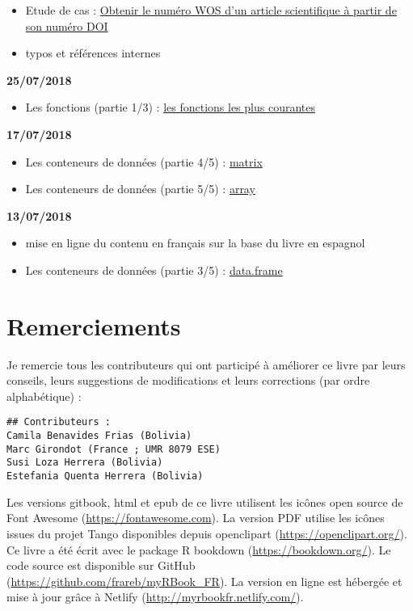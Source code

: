 \documentclass[]{book}
\providecommand{\tightlist}{%
  \setlength{\itemsep}{0pt}\setlength{\parskip}{0pt}}
\theoremstyle{definition}
\theoremstyle{definition}
\theoremstyle{definition}
\theoremstyle{remark}
\begin{document}
\begin{itemize}
\tightlist
\item
  Etude de cas : \protect\hyperlink{studyCase002}{Obtenir le numéro WOS
  d'un article scientifique à partir de son numéro DOI}
\item
  typos et références internes
\end{itemize}

\textbf{25/07/2018}

\begin{itemize}
\tightlist
\item
  Les fonctions (partie 1/3) : \protect\hyperlink{l015mainfun}{les
  fonctions les plus courantes}
\end{itemize}

\textbf{17/07/2018}

\begin{itemize}
\tightlist
\item
  Les conteneurs de données (partie 4/5) :
  \protect\hyperlink{l014matrix}{matrix}
\item
  Les conteneurs de données (partie 5/5) :
  \protect\hyperlink{l014array}{array}
\end{itemize}

\textbf{13/07/2018}

\begin{itemize}
\tightlist
\item
  mise en ligne du contenu en français sur la base du livre en espagnol
\item
  Les conteneurs de données (partie 3/5) :
  \protect\hyperlink{l014dataframe}{data.frame}
\end{itemize}

\chapter{Remerciements}\label{remerciements}

Je remercie tous les contributeurs qui ont participé à améliorer ce
livre par leurs conseils, leurs suggestions de modifications et leurs
corrections (par ordre alphabétique) :

\begin{verbatim}
## Contributeurs :
Camila Benavides Frias (Bolivia)
Marc Girondot (France ; UMR 8079 ESE)
Susi Loza Herrera (Bolivia)
Estefania Quenta Herrera (Bolivia)
\end{verbatim}

Les versions gitbook, html et epub de ce livre utilisent les icônes open
source de Font Awesome (\url{https://fontawesome.com}). La version PDF
utilise les icônes issues du projet Tango disponibles depuis openclipart
(\url{https://openclipart.org/}). Ce livre a été écrit avec le package R
bookdown (\url{https://bookdown.org/}). Le code source est disponible
sur GitHub (\url{https://github.com/frareb/myRBook_FR}). La version en
ligne est hébergée et mise à jour grâce à Netlify
(\url{http://myrbookfr.netlify.com/}).
\end{document}
